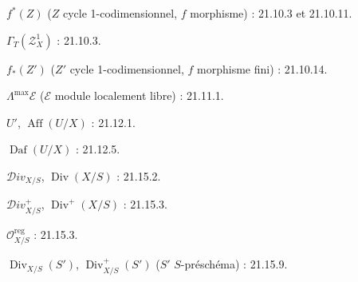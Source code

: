 $f^*(Z)$ ($Z$ cycle 1-codimensionnel, $f$ morphisme) : 21.10.3 et 21.10.11.

$\Gamma_T(\mathscr Z_X^1)$ : 21.10.3.

$f_*(Z')$ ($Z'$ cycle 1-codimensionnel, $f$ morphisme fini) : 21.10.14.

$\Lambda^{\max}\mathcal E$ ($\mathcal E$ module localement libre) : 21.11.1.

$U'$, $\operatorname{Aff}(U/X)$ : 21.12.1.

$\operatorname{Daf}(U/X)$ : 21.12.5.

$\mathcal{D}iv_{X/S}$, $\operatorname{Div}(X/S)$ : 21.15.2.

$\mathcal{D}iv_{X/S}^+$, $\operatorname{Div}^+(X/S)$ : 21.15.3.

$\mathcal O_{X/S}^{\mathrm{reg}}$ : 21.15.3.

$\operatorname{Div}_{X/S}(S')$, $\operatorname{Div}_{X/S}^+(S')$
($S'$ $S$-préschéma) : 21.15.9.

\endgroup
